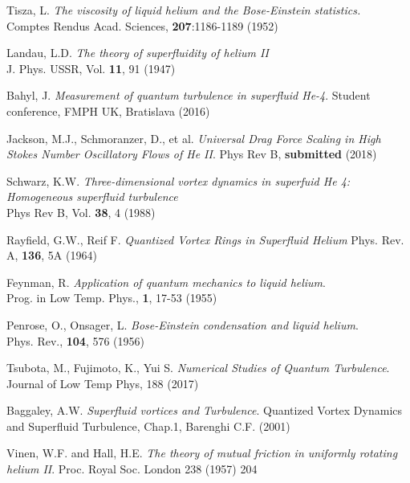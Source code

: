 
\def\bibname{Bibliography}
\begin{thebibliography}{99}
	\addcontentsline{toc}{chapter}{\bibname}

	{\sc Tisza, L.}
	\emph{The viscosity of liquid helium and the Bose-Einstein statistics.}\\
	Comptes Rendus Acad. Sciences, \textbf{207}:1186-1189 (1952)

	{\sc Landau, L.D.}
	\emph{The theory of superfluidity of helium II}\\
	J. Phys. USSR, Vol. \textbf{11}, 91 (1947)

	{\sc Bahyl, J.}
	\emph{Measurement of quantum turbulence in superfluid He-4}.
	Student conference, FMPH UK, Bratislava (2016)

	{\sc Jackson, M.J., Schmoranzer, D., et al.}
	\emph{Universal Drag Force Scaling in High Stokes Number Oscillatory Flows of He II}. Phys Rev B, \textbf{submitted} (2018)

	{\sc Schwarz, K.W.}
	\emph{Three-dimensional vortex dynamics in superfuid He 4: Homogeneous superfluid turbulence}\\
	Phys Rev B, Vol. \textbf{38}, 4 (1988)

	{\sc Rayfield, G.W., Reif F.}
	\emph{Quantized Vortex Rings in Superfluid Helium} Phys. Rev. A, \textbf{136}, 5A (1964)

	{\sc Feynman, R.}
	\emph{Application of quantum mechanics to liquid helium}.\\
	Prog. in Low Temp. Phys., \textbf{1}, 17-53 (1955)

	{\sc Penrose, O., Onsager, L.}
	\emph{Bose-Einstein condensation and liquid helium}.\\
	Phys. Rev., \textbf{104}, 576 (1956)

	{\sc Tsubota, M., Fujimoto, K., Yui S.}
	\emph{Numerical Studies of Quantum Turbulence}.\\
	Journal of Low Temp Phys, 188 (2017)

	{\sc Baggaley, A.W.}
	\emph{Superfluid vortices and Turbulence}. Quantized Vortex Dynamics and Superfluid Turbulence, Chap.1, Barenghi C.F. (2001)

	{\sc Vinen, W.F.} and {\sc Hall, H.E.}
	\emph{The theory of mutual friction in uniformly rotating helium II}.
	Proc. Royal Soc. London 238 (1957) 204


\end{thebibliography}
